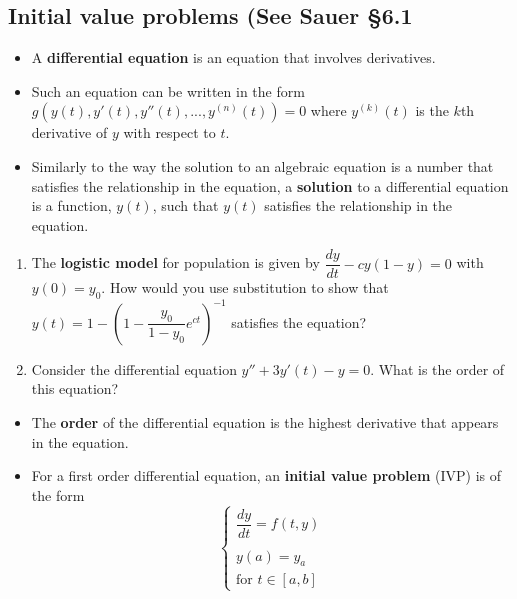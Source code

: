 \documentclass[12pt,letterpaper,noanswers]{exam}
\begin{document}
\subsection*{Initial value problems (See Sauer \S 6.1}
\begin{tcolorbox}
\begin{itemize}
\itemsep0pt
    \item A \textbf{differential equation} is an equation that involves derivatives.
    \item Such an equation can be written in the form $g(y(t),y'(t),y''(t),...,y^{(n)}(t)) = 0$ where $y^{(k)}(t)$ is the $k$th derivative of $y$ with respect to $t$.  
    \item Similarly to the way the solution to an algebraic equation is a number that satisfies the relationship in the equation, a \textbf{solution} to a differential equation is a function, $y(t)$, such that $y(t)$ satisfies the relationship in the equation.
   
\end{itemize}
\end{tcolorbox}
\begin{enumerate}[resume=classQ]
\item The \textbf{logistic model} for population is given by $\dfrac{dy}{dt} - cy(1-y) = 0$ with  $y(0) = y_0$.  How would you use substitution to show that $y(t) = 1 - \left(1-\dfrac{y_0}{1-y_0}e^{ct}\right)^{-1}$ satisfies the equation?
\vspace{1in}
\item Consider the differential equation $y'' + 3y'(t) - y = 0$.  What is the order of this equation?
\vspace{1cm}
\end{enumerate}
\begin{tcolorbox}
\begin{itemize}
\itemsep0pt
     \item The \textbf{order} of the differential equation is the highest derivative that appears in the equation. 
    \item For a first order differential equation, an \textbf{initial value problem} (IVP) is of the form \[\displaystyle\left\{\begin{array}{l}\dfrac{dy}{dt} = f(t,y) \\
    \\
y(a) = y_a \\ \text{for } t \in [a,b] \end{array}\right.\] 
\end{itemize}
\end{tcolorbox}
\end{document}

